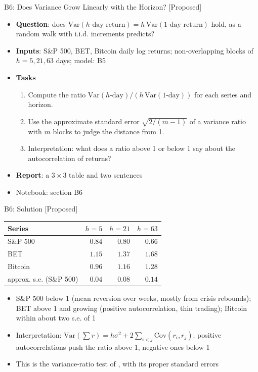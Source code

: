 \begin{frame}{B6: Does Variance Grow Linearly with the Horizon? [Proposed]}
\itemsize{\footnotesize}
\begin{itemize}
\item \textbf{Question}: does $\text{Var}(h\text{-day return}) = h\,\text{Var}(1\text{-day return})$ hold, as a random walk with i.i.d. increments predicts?
\item \textbf{Inputs}: S\&P 500, BET, Bitcoin daily log returns; non-overlapping blocks of $h = 5, 21, 63$ days; model: B5
\item \textbf{Tasks}
\begin{enumerate}
    \item Compute the ratio $\text{Var}(h\text{-day})/(h\,\text{Var}(1\text{-day}))$ for each series and horizon.
    \item Use the approximate standard error $\sqrt{2/(m - 1)}$ of a variance ratio with $m$ blocks to judge the distance from 1.
    \item Interpretation: what does a ratio above 1 or below 1 say about the autocorrelation of returns?
\end{enumerate}
\item \textbf{Report}: a $3 \times 3$ table and two sentences
\item Notebook: section B6
\end{itemize}
\end{frame}

\ifsolutions
\begin{frame}{B6: Solution [Proposed]}
\itemsize{\footnotesize}
\begin{center}
\footnotesize
\begin{tabular}{lrrr}
\toprule
Series & $h = 5$ & $h = 21$ & $h = 63$ \\
\midrule
S\&P 500 & $0.84$ & $0.80$ & $0.66$ \\
BET & $1.15$ & $1.37$ & $1.68$ \\
Bitcoin & $0.96$ & $1.16$ & $1.28$ \\
approx. s.e. (S\&P 500) & $0.04$ & $0.08$ & $0.14$ \\
\bottomrule
\end{tabular}
\end{center}
\begin{itemize}
    \item S\&P 500 below 1 (mean reversion over weeks, mostly from crisis rebounds); BET above 1 and growing (positive autocorrelation, thin trading); Bitcoin within about two s.e. of 1
    \item Interpretation: $\text{Var}(\sum r) = h\sigma^2 + 2\sum_{i<j}\text{Cov}(r_i, r_j)$; positive autocorrelations push the ratio above 1, negative ones below 1
    \item This is the variance-ratio test of , with its proper standard errors
\end{itemize}
\end{frame}
\fi


